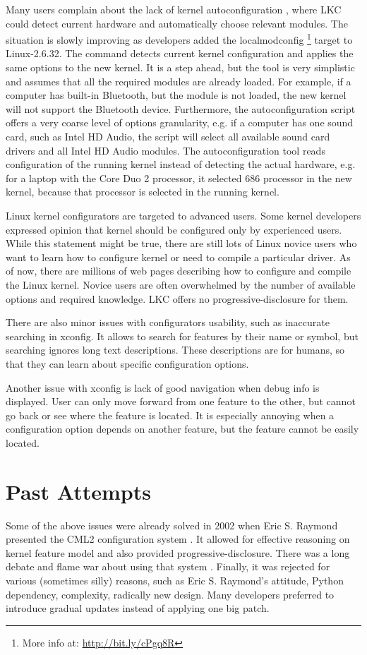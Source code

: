 \documentclass{chi2009}
\begin{document}
Many users complain about the lack of kernel autoconfiguration \cite{debian:config:2010,soft32:config:2007}, where LKC could detect current hardware and automatically choose relevant modules. The situation is slowly improving as developers added the \textsf{localmodconfig} \footnote{More info at: \url{http://bit.ly/cPgq8R}} target to Linux-2.6.32. The command detects current kernel configuration and applies the same options to the new kernel. It is a step ahead, but the tool is very simplistic and assumes that all the required modules are already loaded. For example, if a computer has built-in Bluetooth, but the module is not loaded, the new kernel will not support the Bluetooth device. Furthermore, the autoconfiguration script offers a very coarse level of options granularity, e.g. if a computer has one sound card, such as Intel HD Audio, the script will select all available sound card drivers and all Intel HD Audio modules. The autoconfiguration tool reads configuration of the running kernel instead of detecting the actual hardware, e.g. for a laptop with the Core Duo 2 processor, it selected 686 processor in the new kernel, because that processor is selected in the running kernel.

Linux kernel configurators are targeted to advanced users. Some kernel developers expressed opinion \cite{ADDREF} that kernel should be configured only by experienced users. While this statement might be true, there are still lots of Linux novice users who want to learn how to configure kernel or need to compile a particular driver. As of now, there are millions of web pages describing how to configure and compile the Linux kernel. Novice users are often overwhelmed by the number of available options and required knowledge. LKC offers no progressive-disclosure for them.

There are also minor issues with configurators usability, such as inaccurate searching in xconfig. It allows to search for features by their name or symbol, but searching ignores long text descriptions. These descriptions are for humans, so that they can learn about specific configuration options.

Another issue with xconfig is lack of good navigation when debug info is displayed. User can only move forward from one feature to the other, but cannot go back or see where the feature is located. It is especially annoying when a configuration option depends on another feature, but the feature cannot be easily located.

\section{Past Attempts}
Some of the above issues were already solved in 2002 when Eric S. Raymond presented the CML2 configuration system \cite{raymond:cml2:2000}. It allowed for effective reasoning on kernel feature model and also provided progressive-disclosure. There was a long debate and flame war about using that system \cite{kerneltrap:linux:2002}. Finally, it was rejected for various (sometimes silly) reasons, such as Eric S. Raymond's attitude, Python dependency, complexity, radically new design. Many developers preferred to introduce gradual updates instead of applying one big patch.
\end{document}
